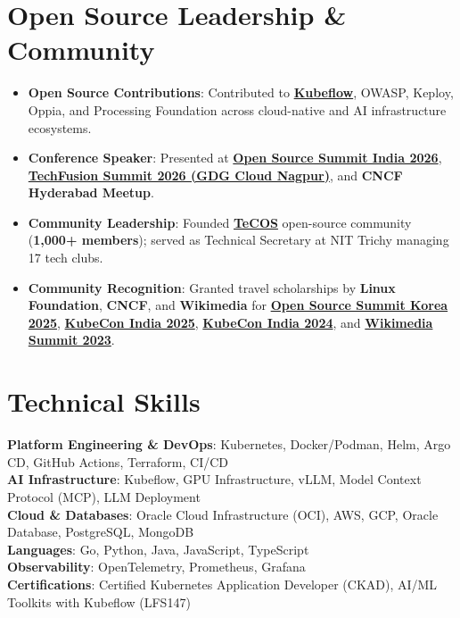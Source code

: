 \documentclass[letterpaper,11pt]{article}
\newcommand{\resumeItem}[1]{
  \item\small{
    {#1 \vspace{-4pt}}
  }
}
\newcommand{\resumeItemListStart}{\begin{itemize}}
\newcommand{\resumeItemListEnd}{\end{itemize}\vspace{-5pt}}
\begin{document}
\section{Open Source Leadership \& Community}
    \resumeItemListStart
    \resumeItem{\textbf{Open Source Contributions}: Contributed to \textbf{\href{https://github.com/kubeflow}{Kubeflow}}, OWASP, Keploy, Oppia, and Processing Foundation across cloud-native and AI infrastructure ecosystems.}
    
    \resumeItem{\textbf{Conference Speaker}: Presented at \href{https://ossindia2026.sched.com/event/2KNF7}{\textbf{Open Source Summit India 2026}}, \href{https://gdg.community.dev/events/details/google-gdg-cloud-nagpur-presents-techfusion-summit-2026/}{\textbf{TechFusion Summit 2026 (GDG Cloud Nagpur)}}, and \textbf{CNCF Hyderabad Meetup}.}
    
    \resumeItem{\textbf{Community Leadership}: Founded \textbf{\href{https://www.instagram.com/tecos.nitt/}{TeCOS}} open-source community (\textbf{1,000+ members}); served as Technical Secretary at NIT Trichy managing 17 tech clubs.}
    
    \resumeItem{\textbf{Community Recognition}: Granted travel scholarships by \textbf{Linux Foundation}, \textbf{CNCF}, and \textbf{Wikimedia} for \href{https://www.linkedin.com/posts/akashjaiswal03_opensourcesummit-openssf-opensearchcon-ugcPost-7392580382480658433-a8-J}{\textbf{Open Source Summit Korea 2025}}, \href{https://blog.kubeflow.org/kubecon/community/2025/08/23/kubecon-2025-india-kubeflow.html}{\textbf{KubeCon India 2025}}, \href{https://www.cncf.io/blog/2025/03/17/kubecon-cloudnativecon-india-2024-from-dreams-to-reality-journey/}{\textbf{KubeCon India 2024}}, and \href{https://indicwiki.iiit.ac.in/summit-2023/}{\textbf{Wikimedia Summit 2023}}.}
    \resumeItemListEnd

\section{Technical Skills}
\begin{itemize}[leftmargin=0.15in, label={}]
\small{\item{
\textbf{Platform Engineering \& DevOps}{: Kubernetes, Docker/Podman, Helm, Argo CD, GitHub Actions, Terraform, CI/CD} \\
\textbf{AI Infrastructure}{: Kubeflow, GPU Infrastructure, vLLM, Model Context Protocol (MCP), LLM Deployment} \\
\textbf{Cloud \& Databases}{: Oracle Cloud Infrastructure (OCI), AWS, GCP, Oracle Database, PostgreSQL, MongoDB} \\
\textbf{Languages}{: Go, Python, Java, JavaScript, TypeScript} \\
\textbf{Observability}{: OpenTelemetry, Prometheus, Grafana} \\
\textbf{Certifications}{: Certified Kubernetes Application Developer (CKAD), AI/ML Toolkits with Kubeflow (LFS147)}
}}
\end{itemize}
 \vspace{-15pt}
\end{document}
